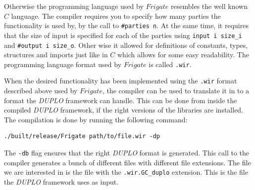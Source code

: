 \documentclass[twoside,11pt,openright]{report}
\newcommand{\DUPLO}{\textit{DUPLO} }
\begin{document}
Otherwise the programming language used by $Frigate$ resembles the well known $C$ language. The compiler requires you to specify how many parties the functionality is used by, by the call to \verb|#parties n|. At the same time, it requires that the size of input is specified for each of the parties using \verb|input i size_i| and \verb|#output i size_o|. Other wise it allowed for definitions of constants, types, structures and imports just like in $C$ which allows for some easy readability. The programming language format used by $Frigate$ is called \verb|.wir|.

\bigskip

When the desired functionality has been implemented using the \verb|.wir| format described above used by $Frigate$, the compiler can be used to translate it in to a format the \DUPLO framework can handle. This can be done from inside the compiled \DUPLO framework, if the right versions of the libraries are installed. The compilation is done by running the following command:

\begin{center}
\begin{verbatim}
./built/release/Frigate path/to/file.wir -dp
\end{verbatim}
\end{center}

The \verb|-db| flag ensures that the right \DUPLO format is generated. This call to the compiler generates a bunch of different files with different file extensions. The file we are interested in is the file with the \verb|.wir.GC_duplo| extension. This is the file the \DUPLO framework uses as input.

\bigskip
\end{document}
